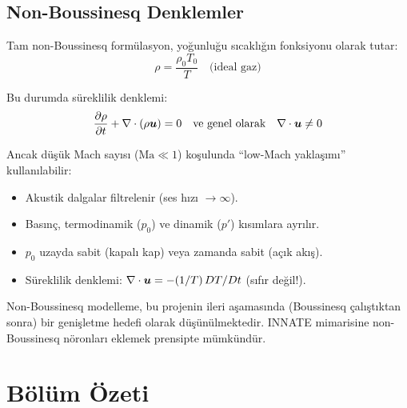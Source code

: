 \subsection{Non-Boussinesq Denklemler}

Tam non-Boussinesq formülasyon, yoğunluğu sıcaklığın fonksiyonu olarak tutar:
\begin{equation}
    \rho = \frac{\rho_0 T_0}{T} \quad \text{(ideal gaz)}
    \label{eq:non_bouss_eos}
\end{equation}

Bu durumda süreklilik denklemi:
\begin{equation}
    \frac{\partial \rho}{\partial t} + \nabla \cdot(\rho\bm{u}) = 0 \quad \text{ve genel olarak} \quad \nabla \cdot\bm{u} \neq 0
\end{equation}

Ancak düşük Mach sayısı ($\mathrm{Ma} \ll 1$) koşulunda ``low-Mach yaklaşımı'' kullanılabilir:
\begin{itemize}
    \item Akustik dalgalar filtrelenir (ses hızı $\to \infty$).
    \item Basınç, termodinamik ($p_0$) ve dinamik ($p'$) kısımlara ayrılır.
    \item $p_0$ uzayda sabit (kapalı kap) veya zamanda sabit (açık akış).
    \item Süreklilik denklemi: $\nabla \cdot\bm{u} = -(1/T)\,DT/Dt$ (sıfır değil!).
\end{itemize}

Non-Boussinesq modelleme, bu projenin ileri aşamasında (Boussinesq çalıştıktan sonra) bir genişletme hedefi olarak düşünülmektedir. INNATE mimarisine non-Boussinesq nöronları eklemek prensipte mümkündür.


\section{Bölüm Özeti}
\label{sec:boussinesq_ozet}

